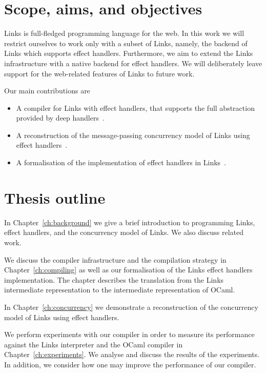 \documentclass[12pt,mscres,cdtppar,twoside,openright,logo,rightchapter,normalheadings]{infthesis}
\theoremstyle{definition}
\begin{document}
\section{Scope, aims, and objectives}

Links is full-fledged programming language for the web. In this work
we will restrict ourselves to work only with a subset of Links,
namely, the backend of Links which supports effect
handlers. Furthermore, we aim to extend the Links infrastructure with
a native backend for effect handlers. We will deliberately leave
support for the web-related features of Links to future work.

Our main contributions are
\begin{itemize}
\item A compiler for Links with effect handlers, that supports the
  full abstraction provided by deep handlers~\citep{Hillerstrom2016b}.
\item A reconstruction of the message-passing concurrency model of
  Links using effect handlers~\citep{Hillerstrom2016c}.
\item A formalisation of the implementation of effect handlers in
  Links~\citep{Hillerstrom2016a}.
\end{itemize}
\section{Thesis outline}

In Chapter~\ref{ch:background} we give a brief introduction to
programming Links, effect handlers, and the concurrency model of
Links. We also discuss related work.

We discuss the compiler infrastructure and the compilation strategy in
Chapter~\ref{ch:compiling} as well as our formalisation of the Links
effect handlers implementation. The chapter describes the translation
from the Links intermediate representation to the intermediate
representation of OCaml.

In Chapter~\ref{ch:concurrency} we demonstrate a reconstruction of the
concurrency model of Links using effect handlers.

We perform experiments with our compiler in order to measure its
performance against the Links interpreter and the OCaml compiler in
Chapter~\ref{ch:experiments}. We analyse and discuss the results of
the experiments. In addition, we consider how one may improve the
performance of our compiler.
\end{document}
